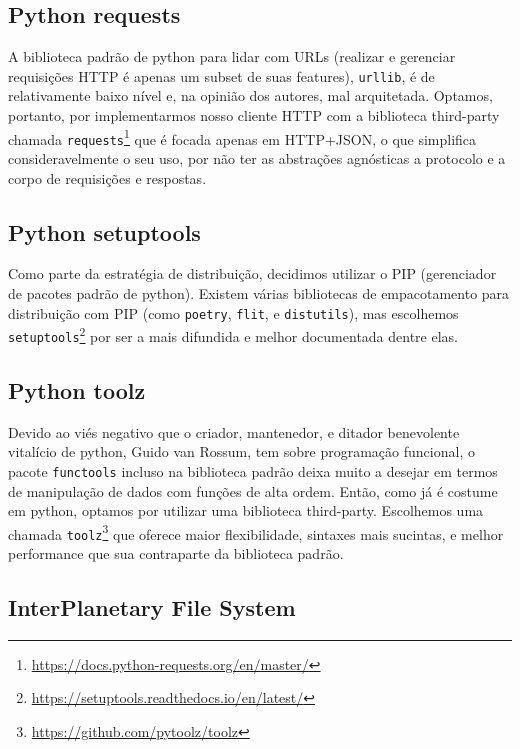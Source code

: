 \subsection{Python requests}

A biblioteca padrão de python para lidar com URLs (realizar e gerenciar requisições HTTP é apenas um subset de suas features), \texttt{urllib}, é de relativamente baixo nível e, na opinião dos autores, mal arquitetada.
Optamos, portanto, por implementarmos nosso cliente HTTP com a biblioteca third-party chamada \texttt{requests}\footnote{\url{https://docs.python-requests.org/en/master/}} que é focada apenas em HTTP+JSON, o que simplifica consideravelmente o seu uso, por não ter as abstrações agnósticas a protocolo e a corpo de requisições e respostas.

\subsection{Python setuptools}

Como parte da estratégia de distribuição, decidimos utilizar o PIP (gerenciador de pacotes padrão de python).
Existem várias bibliotecas de empacotamento para distribuição com PIP (como \texttt{poetry}, \texttt{flit}, e \texttt{distutils}), mas escolhemos \texttt{setuptools}\footnote{\url{https://setuptools.readthedocs.io/en/latest/}} por ser a mais difundida e melhor documentada dentre elas.

\subsection{Python toolz}

Devido ao viés negativo que o criador, mantenedor, e ditador benevolente vitalício de python, Guido van Rossum, tem sobre programação funcional, o pacote \texttt{functools} incluso na biblioteca padrão deixa muito a desejar em termos de manipulação de dados com funções de alta ordem.
Então, como já é costume em python, optamos por utilizar uma biblioteca third-party.
Escolhemos uma chamada \texttt{toolz}\footnote{\url{https://github.com/pytoolz/toolz}} que oferece maior flexibilidade, sintaxes mais sucintas, e melhor performance que sua contraparte da biblioteca padrão.

\subsection{\label{subsec:ipfs}InterPlanetary File System}


